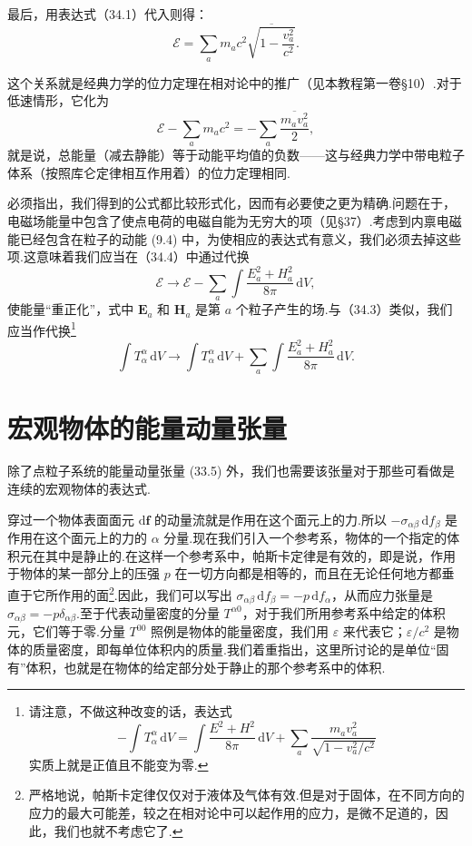 最后，用表达式（34.1）代入则得：
\begin{equation}
  \mathcal{E}=\sum_a m_ac^2
  \overline{\sqrt{1-\frac{v_a^2}{c^2}}}.
\end{equation}

这个关系就是经典力学的位力定理在相对论中的推广（见本教程第一卷§10）.对于低速情形，它化为
\begin{equation*}
  \mathcal{E}-\sum_a m_ac^2
  =-\sum_a\overline{\frac{m_av_a^2}{2}},
\end{equation*}
就是说，总能量（减去静能）等于动能平均值的负数——这与经典力学中带电粒子体系（按照库仑定律相互作用着）的位力定理相同.

必须指出，我们得到的公式都比较形式化，因而有必要使之更为精确.问题在于，电磁场能量中包含了使点电荷的电磁自能为无穷大的项（见§37）.考虑到内禀电磁能已经包含在粒子的动能
(9.4) 中，为使相应的表达式有意义，我们必须去掉这些项.这意味着我们应当在（34.4）中通过代换
\begin{equation*}
  \mathcal{E}\to\mathcal{E}
  -\sum_a\int\frac{E_a^2+H_a^2}{8\pi}\,\mathrm{d}V,
\end{equation*}
使能量“重正化”，式中 $\boldsymbol{E}_a$ 和 $\boldsymbol{H}_a$ 是第 $a$
个粒子产生的场.与（34.3）类似，我们应当作代换\footnote{请注意，不做这种改变的话，表达式
\begin{equation*}
  -\int T_\alpha^\alpha\,\mathrm{d}V=\int\frac{E^2+H^2}{8\pi}\,\mathrm{d}V+\sum_a\frac{m_av_a^2}{\sqrt{1-v_a^2/c^2}}
\end{equation*}
实质上就是正值且不能变为零.}
\begin{equation*}
  \int T_\alpha^\alpha\,\mathrm{d}V\to
  \int T_\alpha^\alpha\,\mathrm{d}V
  +\sum_a\int\frac{E_a^2+H_a^2}{8\pi}\,\mathrm{d}V.
\end{equation*}

\section{宏观物体的能量动量张量}

除了点粒子系统的能量动量张量 (33.5)
外，我们也需要该张量对于那些可看做是连续的宏观物体的表达式.

穿过一个物体表面面元 $\mathrm{d}\boldsymbol{f}$
的动量流就是作用在这个面元上的力.所以 $-\sigma_{\alpha\beta}\,\mathrm{d}f_\beta$
是作用在这个面元上的力的 $\alpha$
分量.现在我们引入一个参考系，物体的一个指定的体积元在其中是静止的.在这样一个参考系中，帕斯卡定律是有效的，即是说，作用于物体的某一部分上的压强
$p$ 在一切方向都是相等的，而且在无论任何地方都垂直于它所作用的面\footnote{严格地说，帕斯卡定律仅仅对于液体及气体有效.但是对于固体，在不同方向的应力的最大可能差，较之在相对论中可以起作用的应力，是微不足道的，因此，我们也就不考虑它了.}.因此，我们可以写出
$\sigma_{\alpha\beta}\,\mathrm{d}f_\beta=-p\,\mathrm{d}f_\alpha$，从而应力张量是
$\sigma_{\alpha\beta}=-p\delta_{\alpha\beta}$.至于代表动量密度的分量 $T^{\alpha0}$，对于我们所用参考系中给定的体积元，它们等于零.分量
$T^{00}$ 照例是物体的能量密度，我们用 $\varepsilon$ 来代表它；$\varepsilon/c^2$
是物体的质量密度，即每单位体积内的质量.我们着重指出，这里所讨论的是单位“固有”体积，也就是在物体的给定部分处于静止的那个参考系中的体积.

